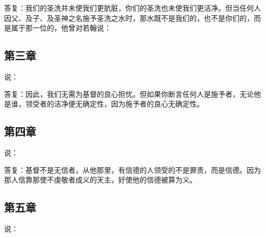 答复：我们的圣洗并未使我们更肮脏，你们的圣洗也未使我们更洁净。但当任何人因父、及子、及圣神之名施予圣洗之水时，那水既不是我们的，也不是你们的，而是属于那一位的，他曾对若翰说：\par


\subsection{第三章}

说：\par

答复：因此，我们无需为基督的良心担忧。但如果你断言任何人是施予者，无论他是谁，领受者的洁净便无确定性，因为施予者的良心无确定性。\par


\subsection{第四章}

说：\par

答复：基督不是无信者，从他那里，有信德的人领受的不是罪责，而是信德。因为那人信靠那使不虔敬者成义的天主，好使他的信德被算为义。\par


\subsection{第五章}

说：\par

